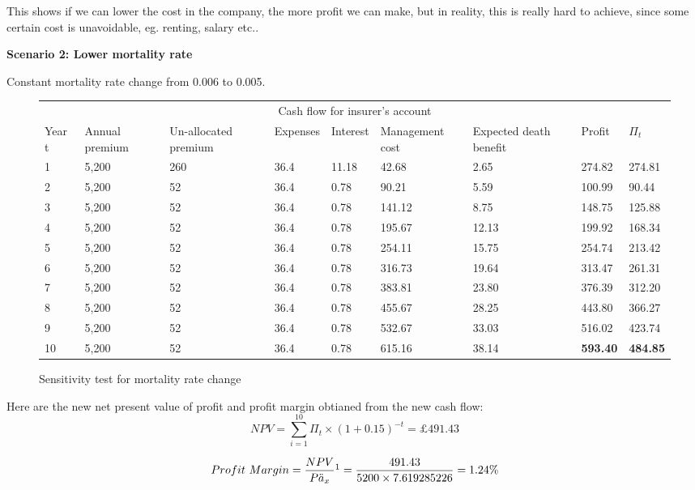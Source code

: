 \documentclass{report}
\begin{document}
This shows if we can lower the cost in the company, the more profit we can make, but in reality, this is really hard to achieve, since some certain cost is unavoidable, eg. renting, salary etc..




\textbf{Scenario 2: Lower mortality rate} 

Constant mortality rate change from 0.006 to 0.005.



\begin{figure}[H]
\hfill
\begin{tabular}{p{0.8cm} p{1.5cm} p{1.5cm} p{1.2cm} p{1cm} p{2cm}p{1.5cm} p{1.5cm} p{1.5cm} }
\toprule
\multicolumn{9}{c}{Cash flow for insurer's account} \\
\cmidrule(r){3-7}

Year t & Annual premium & Un-allocated premium & Expenses & Interest &Management cost& Expected death benefit & Profit& $\Pi_t$  \\
\midrule

1&5,200&260&36.4&11.18&42.68&2.65&274.82&274.81\\
2&5,200&52&36.4&0.78&90.21&5.59&100.99&90.44\\
3&5,200&52&36.4&0.78&141.12&8.75&148.75&125.88\\
4&5,200&52&36.4&0.78&195.67&12.13&199.92&168.34\\
5&5,200&52&36.4&0.78&254.11&15.75&254.74&213.42\\
6&5,200&52&36.4&0.78&316.73&19.64&313.47&261.31\\
7&5,200&52&36.4&0.78&383.81&23.80&376.39&312.20\\
8&5,200&52&36.4&0.78&455.67&28.25&443.80&366.27\\
9&5,200&52&36.4&0.78&532.67&33.03&516.02&423.74\\
10&5,200&52&36.4&0.78&615.16&38.14&\textbf{593.40}&\textbf{484.85}\\

\bottomrule
\end{tabular}
\caption{Sensitivity test for mortality rate change}
\label{determ-sensi-morta}
\end{figure}

Here are the new net present value of profit and profit margin obtianed from the new cash flow:
\[
 NPV=\sum_{i=1}^{10} \Pi_t \times (1+0.15)^{-t} = \pounds 491.43
\]
 


\[
Profit\ Margin =  \frac{NPV}{P \ddot{a}_x}\footnote{$\ddot{a}_x$=$\sum_{i=1}^{10} v^t {_tp_x}$=7.619285226, where $_tp_x$ read from table ?!?!?!? and $v=\frac{1}{1+0.05}$}  = \frac{491.43}{5200 \times 7.619285226} = 1.24\%
\]
\end{document}

